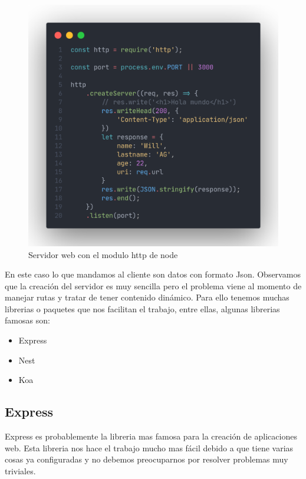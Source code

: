\documentclass[12pt]{article}
\begin{document}
\begin{figure}[H]
  \centering
  \includegraphics[scale=.35]{assets/images/basic-server.png}
  \caption{Servidor web con el modulo http de node}
\end{figure}

En este caso lo que mandamos al cliente son datos con formato Json. Observamos que la creación del servidor es muy sencilla pero el problema viene al momento de manejar rutas y tratar de tener contenido dinámico. Para ello tenemos muchas librerias o paquetes que nos facilitan el trabajo, entre ellas, algunas librerias famosas son:

\begin{itemize}
  \item Express
  \item Nest
  \item Koa
\end{itemize}

\subsection{Express}

Express es probablemente la libreria mas famosa para la creación de aplicaciones web. Esta libreria nos hace el trabajo mucho mas fácil debido a que tiene varias cosas ya configuradas y no debemos preocuparnos por resolver problemas muy triviales.
\end{document}
